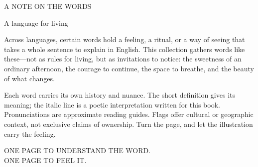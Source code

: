 \begin{ArtPage}
\vspace*{\fill}
\begin{center}
{\Fontgaramondbold\fontsize{6.5}{9}\selectfont\color{Muted}%
  A NOTE ON THE WORDS\par}
\vspace{1.05cm}
{\Fontgaramond\fontsize{32}{38}\selectfont\color{Ink}%
  A language for living\par}
\end{center}
\vspace{0.8cm}
\begin{minipage}{.88\linewidth}
\Fontgaramond\fontsize{13}{18}\selectfont\color{Ink}
Across languages, certain words hold a feeling, a ritual, or a way of seeing
that takes a whole sentence to explain in English. This collection gathers
words like these—not as rules for living, but as invitations to notice: the
sweetness of an ordinary afternoon, the courage to continue, the space to
breathe, and the beauty of what changes.

\vspace{0.8em}
Each word carries its own history and nuance. The short definition gives its
meaning; the italic line is a poetic interpretation written for this book.
Pronunciations are approximate reading guides. Flags offer cultural or
geographic context, not exclusive claims of ownership. Turn the page, and let
the illustration carry the feeling.
\end{minipage}
\vfill
\begin{center}
{\Fontgaramondbold\fontsize{6}{9}\selectfont\color{Muted}%
  ONE PAGE TO UNDERSTAND THE WORD. \\ONE PAGE TO FEEL IT.\par}
\end{center}
\vspace*{\fill}
\end{ArtPage}
